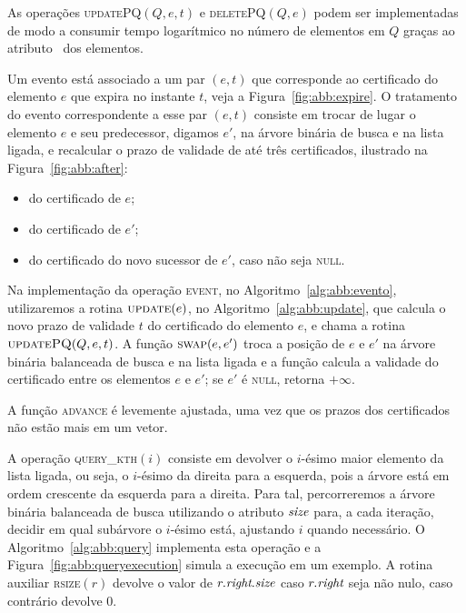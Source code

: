 As operações \textsc{updatePQ}$(Q,e,t)$ e \textsc{deletePQ}$(Q,e)$ podem ser implementadas de modo
a consumir tempo logarítmico no número de elementos em $Q$ graças ao
atributo \pqpos~dos elementos.



Um evento está associado a um par $(e, t)$ que corresponde ao
certificado do elemento $e$ que expira no instante $t$, veja a Figura~\ref{fig:abb:expire}.
O tratamento do evento correspondente a esse par $(e, t)$ consiste em trocar de
lugar o elemento $e$ e seu predecessor, digamos $e'$, na árvore
binária de busca e na lista ligada, e recalcular o prazo de validade
de até três certificados, ilustrado na Figura~\ref{fig:abb:after}:

\begin{itemize}
    \item do certificado de $e$;
    \item do certificado de $e'$;
    \item do certificado do novo sucessor de $e'$, caso não seja \textsc{null}.
\end{itemize}



Na implementação da operação \textsc{event}, no Algoritmo~\ref{alg:abb:evento}, utilizaremos a rotina
$\textsc{update}(e)$, no Algoritmo~\ref{alg:abb:update}, que calcula o novo prazo de validade $t$
do certificado do elemento $e$, e chama a rotina~$\textsc{updatePQ}(Q, e, t)$.
A função $\textsc{swap}(e, e')$ troca a posição de $e$ e $e'$ na árvore binária balanceada
de busca e na lista ligada e a função  calcula
a validade do certificado entre os elementos $e$ e $e'$; se $e'$ é
\textsc{null}, retorna $+\infty$.

A função \textsc{advance} é levemente ajustada, uma vez que os prazos dos certificados não estão
mais em um vetor.







A operação \textsc{query\_kth}$(i)$ consiste em devolver o $i$-ésimo
maior elemento da lista ligada, ou seja, o $i$-ésimo da direita para
a esquerda, pois a árvore está em ordem crescente da esquerda para a
direita.
Para tal, percorreremos a árvore binária balanceada de busca utilizando o atributo $\textit{size}$
para, a cada iteração, decidir em qual subárvore o $i$-ésimo está, ajustando $i$ quando
necessário.
O Algoritmo~\ref{alg:abb:query} implementa esta operação e a Figura~\ref{fig:abb:queryexecution}
simula a execução em um exemplo.
A rotina auxiliar \textsc{rsize}$(r)$ devolve o valor de $r.\textit{right}.\textit{size}$ caso $r.\textit{right}$ seja
não nulo, caso contrário devolve $0$.

